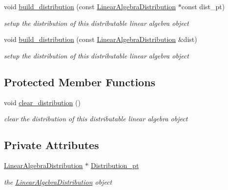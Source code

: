 \begin{DoxyCompactItemize}
void \hyperlink{classoomph_1_1DistributableLinearAlgebraObject_ac5340bac40b9559b0378037b57005203}{build\+\_\+distribution} (const \hyperlink{classoomph_1_1LinearAlgebraDistribution}{Linear\+Algebra\+Distribution} $\ast$const dist\+\_\+pt)
\begin{DoxyCompactList}\small\item\em setup the distribution of this distributable linear algebra object \end{DoxyCompactList}\item 
void \hyperlink{classoomph_1_1DistributableLinearAlgebraObject_adad20ac61a61d907f823da7694b50616}{build\+\_\+distribution} (const \hyperlink{classoomph_1_1LinearAlgebraDistribution}{Linear\+Algebra\+Distribution} \&dist)
\begin{DoxyCompactList}\small\item\em setup the distribution of this distributable linear algebra object \end{DoxyCompactList}\end{DoxyCompactItemize}
\subsection*{Protected Member Functions}
\begin{DoxyCompactItemize}
\item 
void \hyperlink{classoomph_1_1DistributableLinearAlgebraObject_a30742aa2ac9abcfa037179f2d28ff43a}{clear\+\_\+distribution} ()
\begin{DoxyCompactList}\small\item\em clear the distribution of this distributable linear algebra object \end{DoxyCompactList}\end{DoxyCompactItemize}
\subsection*{Private Attributes}
\begin{DoxyCompactItemize}
\item 
\hyperlink{classoomph_1_1LinearAlgebraDistribution}{Linear\+Algebra\+Distribution} $\ast$ \hyperlink{classoomph_1_1DistributableLinearAlgebraObject_a94280ec477823427098dc46b20e29f5a}{Distribution\+\_\+pt}
\begin{DoxyCompactList}\small\item\em the \hyperlink{classoomph_1_1LinearAlgebraDistribution}{Linear\+Algebra\+Distribution} object \end{DoxyCompactList}\end{DoxyCompactItemize}


